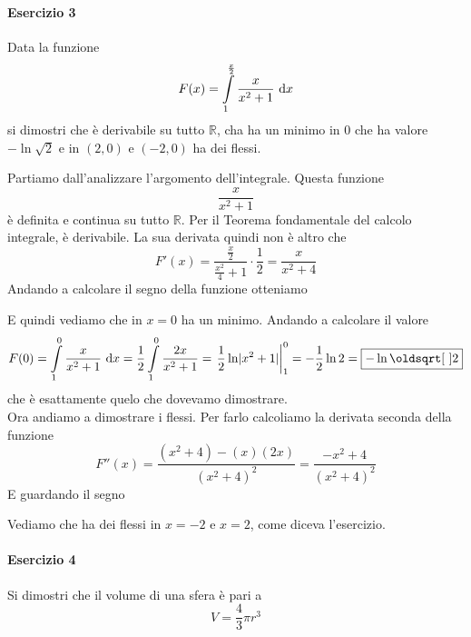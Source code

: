 \paragraph{Esercizio 3}
Data la funzione
\begin{equation*}
  F(x)=\int\limits_{1}^{\frac{x}{2}} \frac{x}{x^2+1}\,\mathop{}\!\mathrm{d} x
\end{equation*}
si dimostri che è derivabile su tutto $\mathbb{R}$, cha ha un minimo in $0$ che ha valore 
$-\ln\sqrt{2}$ e in $(2,0)$ e $(-2,0)$ ha dei flessi.
\divisor

Partiamo dall'analizzare l'argomento dell'integrale. Questa funzione
\begin{equation*}
  \frac{x}{x^2+1}
\end{equation*}
è definita e continua su tutto $\mathbb{R}$. Per il Teorema fondamentale del calcolo integrale,
è derivabile. La sua derivata quindi non è altro che
\begin{equation*}
  F'(x)=\frac{\frac{x}{2}}{\frac{x^2}{4}+1}\cdot\frac{1}{2} = \frac{x}{x^2+4}
\end{equation*}
Andando a calcolare il segno della funzione otteniamo
\begin{center}
\end{center}
E quindi vediamo che in $x=0$ ha un minimo. Andando a calcolare il valore
\begin{equation*}
  F(0) = \int\limits_{1}^{0} \frac{x}{x^2+1}\,\dif x=
  \frac{1}{2}\int\limits_{1}^{0} \frac{2x}{x^2+1}=
  \left.\frac{1}{2}\ln\abs{x^2+1}\right|_1^0=-\frac{1}{2}\ln2=\boxed{-\ln\sqrt{2}}
\end{equation*}
che è esattamente quelo che dovevamo dimostrare.\\
Ora andiamo a dimostrare i flessi. Per farlo calcoliamo la derivata seconda della funzione
\begin{equation*}
  F''(x)=\frac{(x^2+4)-(x)(2x)}{(x^2+4)^2}=\frac{-x^2+4}{(x^2+4)^2}
\end{equation*}
E guardando il segno
\begin{center}
\end{center}
Vediamo che ha dei flessi in $x=-2$ e $x=2$, come diceva l'esercizio.

\paragraph{Esercizio 4}
Si dimostri che il volume di una sfera è pari a
\begin{equation*}
  V = \frac{4}{3}\pi r^3
\end{equation*}
\divisor

